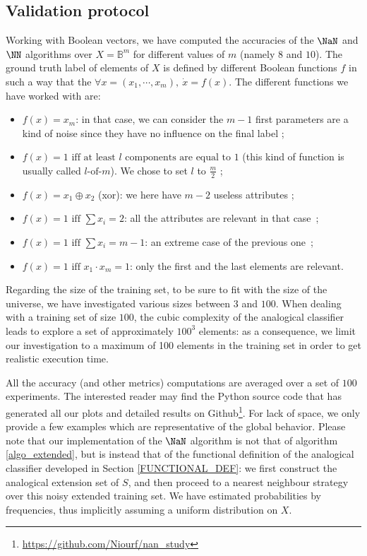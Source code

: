 \documentclass{ecai}
\begin{document}
\subsection{Validation protocol}
Working with Boolean vectors, we have computed the accuracies of the $\NaN$ and
$\NN$ algorithms over $X=\mathbb{B}^m$ for different values of $m$ (namely $8$
and $10$). The ground truth label of elements of $X$ is
defined by different Boolean functions $f$ in such a way that the $\forall x =
(x_1, \cdots, x_m), ~ \dot{x} = f(x)$. The different functions we have worked
with are:
\begin{itemize}
\item $f(x)=x_m$: in that case, we can consider the $m-1$ first
  parameters are a kind of noise since they have no influence on the final
  label ;
\item $f(x) = 1 \mbox{ iff at least } l  \mbox{ components are equal
  to } 1$ (this kind of function is usually called $l\text{-of-}m$). We chose
  to set $l$ to $\frac{m}{2}$ ;
\item $f(x)= x_1 \oplus  x_2$ (xor): we here have $m-2$ useless attributes ;
\item $f(x)=1 \mbox { iff } \sum x_i =2$: all the attributes are relevant in
  that case~;
\item $f(x)=1 \mbox { iff } \sum x_i = m-1$: an extreme case of
  the previous one~;
\item $f(x)=1 \mbox { iff } x_1 \cdot x_m = 1$: only the first and
  the last elements are relevant.
\end{itemize}

Regarding the size of the training set, to be sure to fit with the size of the
universe, we have investigated various sizes between $3$ and $100$. When
dealing with a training set of size $100$, the cubic complexity of the
analogical classifier leads to explore a set of approximately $100^3$ elements:
as a consequence, we limit our investigation to a maximum of 100 elements in
the training set in order to get realistic execution time.

All the accuracy (and other metrics) computations are averaged over a set of
$100$ experiments.  The interested reader may find the Python source code that
has generated all our plots and detailed results on
Github\footnote{\href{https://github.com/Niourf/nan\_study}{https://github.com/Niourf/nan\_study}}. For lack of space,
we only provide a few examples which are representative of the global behavior.
Please note that our implementation of the $\NaN$ algorithm is not that of
algorithm \ref{algo_extended}, but is instead that of the functional definition
of the analogical classifier developed in Section \ref{FUNCTIONAL_DEF}: we
first construct the analogical extension set of $S$, and then proceed to a
nearest neighbour strategy over this noisy extended training set. We have
estimated probabilities by frequencies, thus implicitly assuming a uniform
distribution on $X$.
\end{document}
